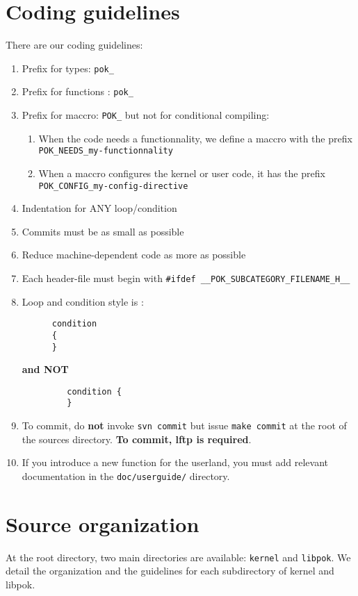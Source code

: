 \documentclass[oneside]{article}
\begin{document}
\section{Coding guidelines}
There are our coding guidelines:
\begin{enumerate}
    \item
      Prefix for types: \texttt{pok\_}
   \item
      Prefix for functions : \texttt{pok\_}
   \item
      Prefix for maccro: \texttt{POK\_} but not for conditional compiling:
      \begin{enumerate}
         \item
            When the code needs a functionnality, we define a maccro with the prefix \texttt{POK\_NEEDS\_my-functionnality}
         \item
            When a maccro configures the kernel or user code, it has the prefix \\ \texttt{POK\_CONFIG\_my-config-directive}
      \end{enumerate}
   \item
      Indentation for ANY loop/condition
   \item
      Commits must be as small as possible
   \item
      Reduce machine-dependent code as more as possible
   \item
      Each header-file must begin with \texttt{\#ifdef \_\_POK\_SUBCATEGORY\_FILENAME\_H\_\_}
   \item
      Loop and condition style is :
      \begin{verbatim}
      condition 
      {
      }
      \end{verbatim}
   \textbf{and NOT}
      \begin{verbatim}
         condition {
         }
      \end{verbatim}
   \item
      To commit, do \textbf{not} invoke \texttt{svn commit} but issue \texttt{make commit} at the root of the
      sources directory. \textbf{To commit, lftp is required}.
   \item
      If you introduce a new function for the userland, you must add relevant
      documentation in the \texttt{doc/userguide/} directory.
\end{enumerate}


\section{Source organization}
At the root directory, two main directories are available: \texttt{kernel} and
\texttt{libpok}. We detail the organization and the guidelines for each
subdirectory of kernel and libpok.
\end{document}
